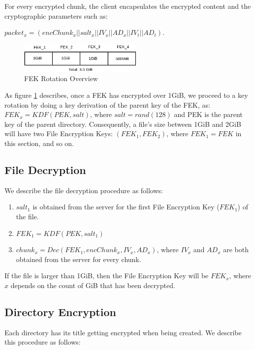 \documentclass[a4paper,9pt,twoside]{article}
\begin{document}
    For every encrypted chunk, the client encapsulates the encrypted content and 
the cryptographic parameters such as:
\begin{center}
$packet_x=(encChunk_x || salt_x || IV_x || AD_x|| IV_t || AD_t)$.
\end{center}

\begin{figure}[H]
\centering
\includegraphics[width=60mm]{./diagram/fek_rotation.png}
\caption{FEK Rotation Overview \label{fekrotation}}
\end{figure}

As figure \ref{fekrotation} describes, once a FEK has encrypted over 1GiB, we proceed to a key rotation by doing 
a key derivation of the parent key of the FEK, as: $FEK_x=KDF(PEK, salt)$, 
where $salt=rand(128)$ and PEK is the parent key of the parent directory. Consequently, a file's size 
between 1GiB and 2GiB will have two File Encryption Keys: $(FEK_1, FEK_2)$, where $FEK_1=FEK$ 
in this section, and so on.

\subsection{File Decryption}

We describe the file decryption procedure as follows:

\begin{enumerate}
\itemsep0em
\item $salt_1$ is obtained from the server for the first File Encryption Key ($FEK_1$) of the file.
\item $FEK_1=KDF(PEK, salt_1)$
\item $chunk_x=Dec(FEK_1, encChunk_x, IV_x, AD_x)$, where $IV_x$ and $AD_x$ are both obtained 
from the server for every chunk.
\end{enumerate}

If the file is larger than 1GiB, then the File Encryption Key will be $FEK_x$, where 
$x$ depends on the count of GiB that has been decrypted.

\subsection{Directory Encryption}

Each directory has its title getting encrypted when being created. We describe 
this procedure as follows:
\end{document}
